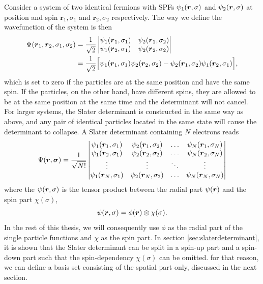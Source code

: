 Consider a system of two identical fermions with SPFs $\psi_1(\boldsymbol{{r}},\sigma)$ and $\psi_2(\boldsymbol{{r}},\sigma)$ at position and spin $\boldsymbol{r}_1,\sigma_1$ and $\boldsymbol{r}_2,\sigma_2$ respectively. The way we define the wavefunction of the system is then
\begin{equation}
\begin{aligned}
\Psi(\boldsymbol{{r}}_1,\boldsymbol{{r}}_2, \sigma_1,\sigma_2)&=\frac{1}{\sqrt{2}}
\begin{vmatrix}
\psi_1(\boldsymbol{r}_1,\sigma_1) & \psi_2(\boldsymbol{r}_1,\sigma_2)\\
\psi_1(\boldsymbol{r}_2,\sigma_1) & \psi_2(\boldsymbol{r}_2,\sigma_2)
\end{vmatrix}\\
&=\frac{1}{\sqrt{2}}\Big[\psi_1(\boldsymbol{r}_1,\sigma_1)\psi_2(\boldsymbol{r}_2,\sigma_2)-\psi_2(\boldsymbol{r}_1,\sigma_2)\psi_1(\boldsymbol{r}_2,\sigma_1)\Big],
\end{aligned}
\end{equation}
which is set to zero if the particles are at the same position and have the same spin. If the particles, on the other hand, have different spins, they are allowed to be at the same position at the same time and the determinant will not cancel. For larger systems, the Slater determinant is constructed in the same way as above, and any pair of identical particles located in the same state will cause the determinant to collapse. A Slater determinant containing $N$ electrons reads
\begin{equation}
\Psi(\boldsymbol{{r}},\boldsymbol{{\sigma}})=\frac{1}{\sqrt{N!}}
\begin{vmatrix}
\psi_1(\boldsymbol{r}_1,\sigma_1) & \psi_2(\boldsymbol{r}_1,\sigma_2) & \hdots & \psi_N(\boldsymbol{r}_1,\sigma_N)\\
\psi_1(\boldsymbol{r}_2,\sigma_1) & \psi_2(\boldsymbol{r}_2,\sigma_2) & \hdots & \psi_N(\boldsymbol{r}_2,\sigma_N)\\
\vdots & \vdots & \ddots & \vdots \\
\psi_1(\boldsymbol{r}_N,\sigma_1) & \psi_2(\boldsymbol{r}_N,\sigma_2) & \hdots & \psi_N(\boldsymbol{r}_N,\sigma_N)
\end{vmatrix}
\end{equation}
where the $\psi(\boldsymbol{{r}},\sigma)$ is the tensor product between the radial part $\psi(\boldsymbol{{r}})$ and the spin part $\chi(\sigma)$,
\begin{equation}
\psi(\boldsymbol{{r}},\sigma)=\phi(\boldsymbol{{r}})\otimes\chi(\sigma).
\end{equation}
In the rest of this thesis, we will consequently use $\phi$ as the radial part of the single particle functions and $\chi$ as the spin part. In section \ref{sec:slaterdeterminant}, it is shown that the Slater determinant can be split in a spin-up part and a spin-down part such that the spin-dependency $\chi(\sigma)$ can be omitted. for that reason, we can define a basis set consisting of the spatial part only, discussed in the next section. 

